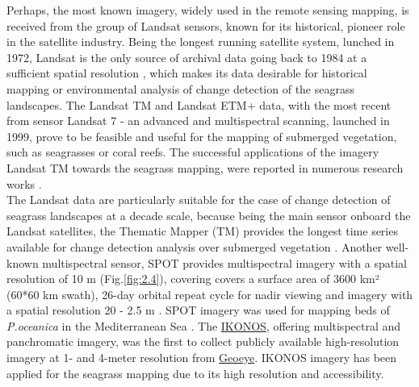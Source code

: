 \documentclass[11pt]{article}
\begin{document}
Perhaps, the most known imagery, widely used in the remote sensing mapping, is received from the
group of Landsat sensors, known for its historical, pioneer role in the satellite industry.
Being the longest running satellite system, lunched in 1972, Landsat is the only source of archival
data going back to 1984 at a sufficient spatial resolution \cite{Dekker05b}\label{Dekker05b}, which makes its data
desirable for historical mapping or environmental analysis of change detection of the seagrass
landscapes.
The \ac{Landsat TM} and \ac{Landsat ETM+} data, with the most recent from sensor Landsat 7 - an advanced
and multispectral scanning, launched in 1999, prove to be feasible and useful for the mapping of
submerged vegetation, such as seagrasses or coral reefs. The successful applications of the imagery
\ac{Landsat TM} towards the seagrass mapping, were reported in numerous research works \cite{Palandro03,Gullstroom06,Wabnitz08,Bierwirth93,Ferguson97,Rasib97}\label{Palandro03}\label{Gullstroom06}\label{Wabnitz08}\label{Bierwirth93}\label{Ferguson97}\label{Rasib97}.\\ The Landsat data are particularly suitable for the
case of change detection of seagrass landscapes at a decade scale, because being the main sensor
onboard the Landsat satellites, the Thematic Mapper (TM) provides the longest time series
available for change detection analysis over submerged vegetation \cite{Palandro03}\label{Palandro03}.
Another well-known multispectral sensor, \ac{SPOT} provides multispectral imagery with a spatial resolution of 10 m (Fig.\ref{fig:2.4}), covering covers a surface area of 3600 km² (60*60 km swath), 26-day
orbital repeat cycle for nadir viewing and imagery with a spatial resolution 20 - 2.5 m
\cite{SPOT}\label{SPOT}. \ac{SPOT} imagery was used for mapping beds of \textit{P.oceanica} in the
Mediterranean Sea \cite{Pasqualini05} \label{Pasqualini05}. 
The \href{http://www.satimagingcorp.com/gallery-ikonos.html}{IKONOS}, offering multispectral and panchromatic imagery, was the first to collect publicly
available high-resolution imagery at 1- and 4-meter resolution from \href{http://www.geoeye.com}{Geoeye}. IKONOS
imagery has been applied for the seagrass mapping due to its high resolution and accessibility. 
\end{document}
